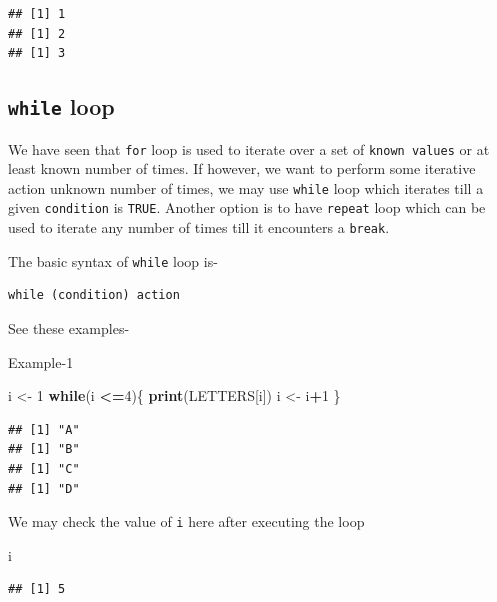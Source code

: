 \documentclass[
]{book}
\newenvironment{Shaded}{\begin{snugshade}}{\end{snugshade}}
\newcommand{\ControlFlowTok}[1]{\textcolor[rgb]{0.13,0.29,0.53}{\textbf{#1}}}
\newcommand{\DecValTok}[1]{\textcolor[rgb]{0.00,0.00,0.81}{#1}}
\newcommand{\FunctionTok}[1]{\textcolor[rgb]{0.13,0.29,0.53}{\textbf{#1}}}
\newcommand{\NormalTok}[1]{#1}
\newcommand{\OtherTok}[1]{\textcolor[rgb]{0.56,0.35,0.01}{#1}}
\newcommand{\SpecialCharTok}[1]{\textcolor[rgb]{0.81,0.36,0.00}{\textbf{#1}}}
\begin{document}
\begin{verbatim}
## [1] 1
## [1] 2
## [1] 3
\end{verbatim}

\hypertarget{while-loop}{%
\subsection*{\texorpdfstring{\texttt{while} loop}{while loop}}\label{while-loop}}

We have seen that \texttt{for} loop is used to iterate over a set of \texttt{known\ values} or at least known number of times. If however, we want to perform some iterative action unknown number of times, we may use \texttt{while} loop which iterates till a given \texttt{condition} is \texttt{TRUE}. Another option is to have \texttt{repeat} loop which can be used to iterate any number of times till it encounters a \texttt{break}.

The basic syntax of \texttt{while} loop is-

\begin{verbatim}
while (condition) action
\end{verbatim}

See these examples-

Example-1

\begin{Shaded}
\begin{Highlighting}[]
\NormalTok{i }\OtherTok{\textless{}{-}} \DecValTok{1}
\ControlFlowTok{while}\NormalTok{(i }\SpecialCharTok{\textless{}=}\DecValTok{4}\NormalTok{)\{}
  \FunctionTok{print}\NormalTok{(LETTERS[i])}
\NormalTok{  i }\OtherTok{\textless{}{-}}\NormalTok{ i}\SpecialCharTok{+}\DecValTok{1}
\NormalTok{\}}
\end{Highlighting}
\end{Shaded}

\begin{verbatim}
## [1] "A"
## [1] "B"
## [1] "C"
## [1] "D"
\end{verbatim}

We may check the value of \texttt{i} here after executing the loop

\begin{Shaded}
\begin{Highlighting}[]
\NormalTok{i}
\end{Highlighting}
\end{Shaded}

\begin{verbatim}
## [1] 5
\end{verbatim}
\end{document}
